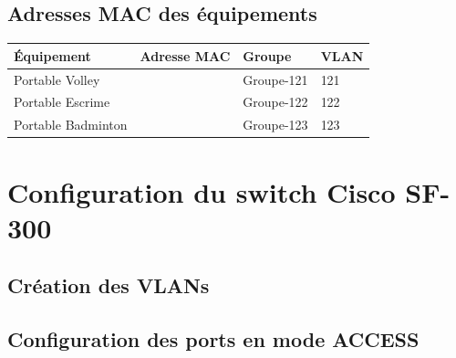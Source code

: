 \documentclass[a4paper,12pt]{article}
\begin{document}
\subsection{Adresses MAC des équipements}

\begin{tabularx}{\textwidth}{L{4cm} C{3cm} C{3cm} C{3cm}}
  \toprule
  \textbf{Équipement} & \textbf{Adresse MAC} & \textbf{Groupe} & \textbf{VLAN} \\
  \midrule
  Portable Volley & & Groupe-121 & 121 \\
  Portable Escrime & & Groupe-122 & 122 \\
  Portable Badminton & & Groupe-123 & 123 \\
  \bottomrule
\end{tabularx}

\section{Configuration du switch Cisco SF-300}

\subsection{Création des VLANs}


\begin{tcolorbox}[colback=black!90, coltext=green!70!white, fontupper=\ttfamily\small,
  title={\color{white}\small Création des VLANs (CLI)}, colbacktitle=primary]
\end{tcolorbox}

\subsection{Configuration des ports en mode ACCESS}


\begin{tcolorbox}[colback=black!90, coltext=green!70!white, fontupper=\ttfamily\small,
  title={\color{white}\small Ports ACCESS (CLI)}, colbacktitle=primary]
\end{tcolorbox}
\end{document}
